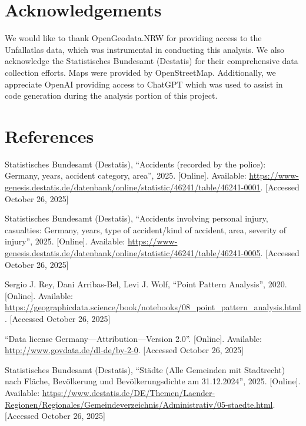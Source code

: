 \documentclass[10pt,a4paper]{article} %
\begin{document}
\section*{Acknowledgements}
We would like to thank OpenGeodata.NRW for providing access to the Unfallatlas data, which was instrumental in conducting this analysis. We also acknowledge the Statistisches Bundesamt (Destatis) for their comprehensive data collection efforts. Maps were provided by OpenStreetMap. Additionally, we appreciate OpenAI providing access to ChatGPT which was used to assist in code generation during the analysis portion of this project.

\newpage

\section*{References}
\begin{enumerate}[label={[\arabic*]}]
    \item Statistisches Bundesamt (Destatis), ``Accidents (recorded by the police): Germany, years, accident category, area'', 2025. [Online]. Available: \url{https://www-genesis.destatis.de/datenbank/online/statistic/46241/table/46241-0001}. [Accessed October 26, 2025] %
    \item Statistisches Bundesamt (Destatis), ``Accidents involving personal injury, casualties: Germany, years, type of accident/kind of accident, area, severity of injury'', 2025. [Online]. Available: \url{https://www-genesis.destatis.de/datenbank/online/statistic/46241/table/46241-0005}. [Accessed October 26, 2025] %
    \item Sergio J. Rey, Dani Arribas-Bel, Levi J. Wolf, ``Point Pattern Analysis'', 2020. [Online]. Available: \url{https://geographicdata.science/book/notebooks/08_point_pattern_analysis.html}. [Accessed October 26, 2025]
    \item ``Data license Germany---Attribution---Version 2.0''. [Online]. Available: \url{http://www.govdata.de/dl-de/by-2-0}. [Accessed October 26, 2025] %
    \item Statistisches Bundesamt (Destatis), ``Städte (Alle Gemeinden mit Stadtrecht) nach Fläche, Bevölkerung und Bevölkerungsdichte am 31.12.2024'', 2025. [Online]. Available: \url{https://www.destatis.de/DE/Themen/Laender-Regionen/Regionales/Gemeindeverzeichnis/Administrativ/05-staedte.html}. [Accessed October 26, 2025] %
\end{enumerate}
\end{document}
